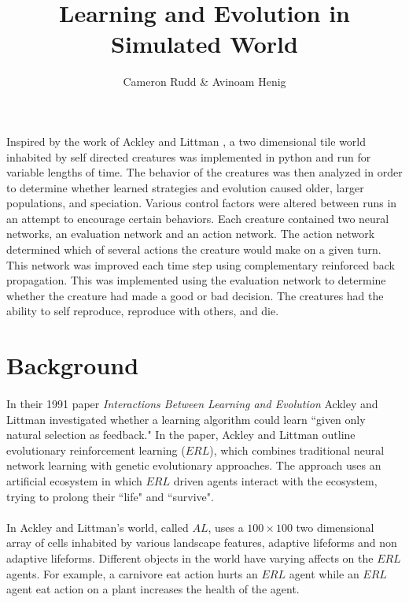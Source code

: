 \documentclass[12pt]{report}
\author{Cameron Rudd \& Avinoam Henig}
\title{Learning and Evolution in Simulated World}
\begin{document}
\maketitle
\abstract 
Inspired by the work of Ackley and Littman \cite{erl}, a two dimensional tile world inhabited by self directed creatures was implemented in python and run for variable lengths of time. The behavior of the creatures was then analyzed in order to determine whether learned strategies and evolution caused older, larger populations, and speciation. Various control factors were altered between runs in an attempt to encourage certain behaviors. Each creature contained two neural networks, an evaluation network and an action network. The action network determined which of several actions the creature would make on a given turn. This network was improved each time step using complementary reinforced back propagation. This was implemented using the evaluation network to determine whether the creature had made a good or bad decision. The creatures had the ability to self reproduce, reproduce with others, and die. 

\section*{Background}

\paragraph{} In their 1991 paper \textit{Interactions Between Learning and Evolution} \cite{erl} Ackley and Littman investigated whether a learning algorithm could learn ``given only natural selection as feedback." In the paper, Ackley and Littman outline evolutionary reinforcement learning ($ERL$), which combines traditional neural network learning with genetic evolutionary approaches. The approach uses an artificial ecosystem in which $ERL$ driven agents interact with the ecosystem, trying to prolong their ``life" and ``survive".
\paragraph{} In Ackley and Littman's world, called $AL$, uses a $100\times 100$ two dimensional array of cells inhabited by various landscape features, adaptive lifeforms and non adaptive lifeforms. Different objects in the world have varying affects on the $ERL$ agents. For example, a carnivore eat action hurts an $ERL$ agent while an $ERL$ agent eat action on a plant increases the health of the agent. 
\end{document}
